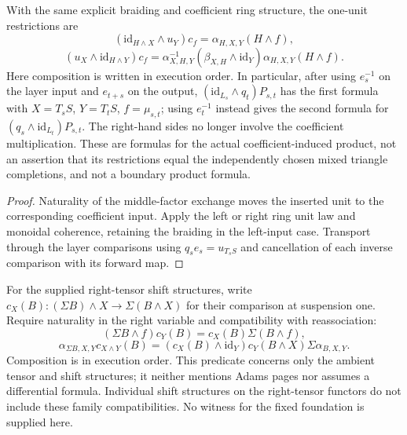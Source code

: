 \begin{proposition}
  \label{prop:h6-coefficient-layer-product-restrictions}
  \leanok
  With the same explicit braiding and coefficient ring structure, the
  one-unit restrictions are
  \[
    (\mathrm{id}_{H\wedge X}\wedge u_Y)c_f
       =\alpha_{H,X,Y}(H\wedge f),
  \]
  \[
    (u_X\wedge\mathrm{id}_{H\wedge Y})c_f
       =\alpha_{X,H,Y}^{-1}(\beta_{X,H}\wedge\mathrm{id}_Y)
          \alpha_{H,X,Y}(H\wedge f).
  \]
  Here composition is written in execution order. In particular, after
  using $e_s^{-1}$ on the layer input and $e_{t+s}$ on the output,
  $(\mathrm{id}_{L_s}\wedge q_t)P_{s,t}$ has the first formula with
  $X=T_sS$, $Y=T_tS$, $f=\mu_{s,t}$; using $e_t^{-1}$ instead gives
  the second formula for $(q_s\wedge\mathrm{id}_{L_t})P_{s,t}$.
  The right-hand sides no longer involve the coefficient multiplication.
  These are formulas for the actual coefficient-induced product, not an
  assertion that its restrictions equal the independently chosen mixed
  triangle completions, and not a boundary product formula.
\end{proposition}
\begin{proof}
  Naturality of the middle-factor exchange moves the inserted unit to the
  corresponding coefficient input. Apply the left or right ring unit law
  and monoidal coherence, retaining the braiding in the left-input case.
  Transport through the layer comparisons using $q_se_s=u_{T_sS}$ and
  cancellation of each inverse comparison with its forward map.
  \leanok
\end{proof}

\begin{definition}
  \label{def:h6-right-tensor-suspension-compatibility}
  \leanok
  For the supplied right-tensor shift structures, write
  $c_X(B):(\Sigma B)\wedge X\to\Sigma(B\wedge X)$ for their comparison
  at suspension one. Require naturality in the right variable and
  compatibility with reassociation:
  \[
    (\Sigma B\wedge f)c_Y(B)=c_X(B)\Sigma(B\wedge f),
  \]
  \[
    \alpha_{\Sigma B,X,Y}c_{X\wedge Y}(B)
       =(c_X(B)\wedge\mathrm{id}_Y)c_Y(B\wedge X)
         \Sigma\alpha_{B,X,Y}.
  \]
  Composition is in execution order. This predicate concerns only the
  ambient tensor and shift structures; it neither mentions Adams pages
  nor assumes a differential formula. Individual shift structures on
  the right-tensor functors do not include these family compatibilities.
  No witness for the fixed foundation is supplied here.
\end{definition}

